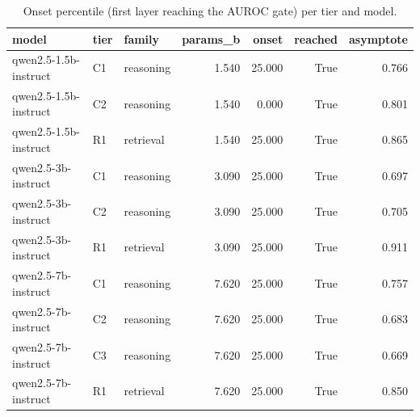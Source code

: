 \begin{table}
\caption{Onset percentile (first layer reaching the AUROC gate) per tier and model.}
\label{tab:t8_h4_depth_onsets}
\begin{tabular}{lllrrrr}
\toprule
model & tier & family & params\_b & onset & reached & asymptote \\
\midrule
qwen2.5-1.5b-instruct & C1 & reasoning & 1.540 & 25.000 & True & 0.766 \\
qwen2.5-1.5b-instruct & C2 & reasoning & 1.540 & 0.000 & True & 0.801 \\
qwen2.5-1.5b-instruct & R1 & retrieval & 1.540 & 25.000 & True & 0.865 \\
qwen2.5-3b-instruct & C1 & reasoning & 3.090 & 25.000 & True & 0.697 \\
qwen2.5-3b-instruct & C2 & reasoning & 3.090 & 25.000 & True & 0.705 \\
qwen2.5-3b-instruct & R1 & retrieval & 3.090 & 25.000 & True & 0.911 \\
qwen2.5-7b-instruct & C1 & reasoning & 7.620 & 25.000 & True & 0.757 \\
qwen2.5-7b-instruct & C2 & reasoning & 7.620 & 25.000 & True & 0.683 \\
qwen2.5-7b-instruct & C3 & reasoning & 7.620 & 25.000 & True & 0.669 \\
qwen2.5-7b-instruct & R1 & retrieval & 7.620 & 25.000 & True & 0.850 \\
\bottomrule
\end{tabular}
\end{table}
